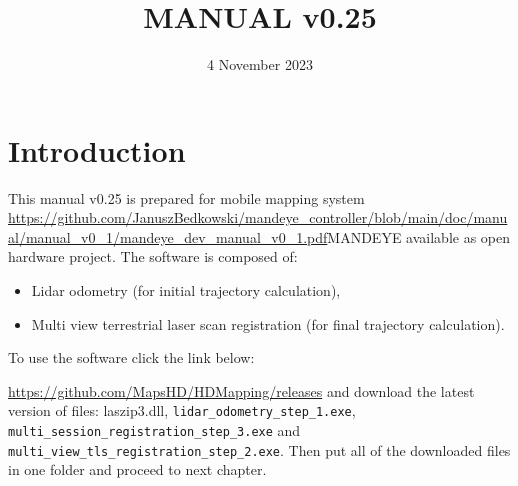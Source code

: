 \documentclass[a4paper,12pt]{book}
\begin{document}
\author{}
\title{MANUAL v0.25}
\date{4 November 2023}

\frontmatter
\maketitle
\tableofcontents

\mainmatter

\chapter{Introduction}
This manual v0.25 is prepared for mobile mapping system \url{https://github.com/JanuszBedkowski/mandeye_controller/blob/main/doc/manual/manual_v0_1/mandeye_dev_manual_v0_1.pdf}{MANDEYE} available as open hardware project.
The software is composed of:
\begin{itemize}
	\item Lidar odometry (for initial trajectory calculation),
	\item Multi view terrestrial laser scan registration (for final trajectory calculation).
\end{itemize}
To use the software click the link below:

\url{https://github.com/MapsHD/HDMapping/releases}
\linebreak
and download the latest version of files: laszip3.dll, \verb|lidar_odometry_step_1.exe|, \verb|multi_session_registration_step_3.exe|  and \verb|multi_view_tls_registration_step_2.exe|.
Then put all of the downloaded files in one folder and proceed to next chapter.











\backmatter
\end{document}
